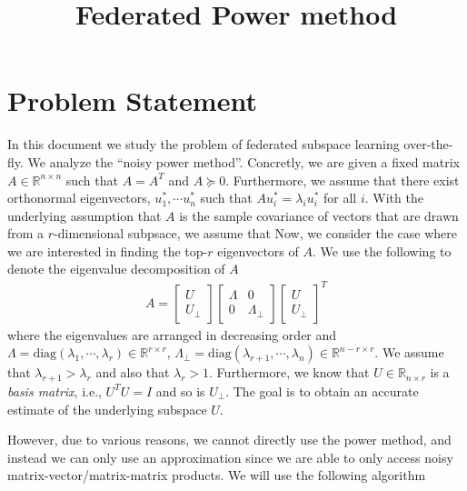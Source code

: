 \documentclass[10pt]{article}
\title{\textbf{Federated Power method}}
\author{}
\date{}
\newcommand{\R}{\mathbb{R}}
\begin{document}
\maketitle


\section{Problem Statement}
In this document we study the problem of federated subspace learning over-the-fly. We analyze the ``noisy power method''. Concretly, we are given a fixed matrix $A \in \R^{n \times n}$ such that $A = A^T$ and $A \succeq 0$. Furthermore, we assume that there exist orthonormal eigenvectors, $u_1^*, \cdots u_n^*$ such that $A u_i^* = \lambda_i u_i^*$ for all $i$. With the underlying assumption that $A$ is the sample covariance of vectors that are drawn from a $r$-dimensional subpsace, we assume that Now, we consider the case where we are interested in finding the top-$r$ eigenvectors of $A$. We use the following to denote the eigenvalue decomposition of $A$ 
\begin{align*}
A = 
\begin{bmatrix}
U \\ U_{\perp}
\end{bmatrix}
\begin{bmatrix}
\Lambda & 0  \\
0 & \Lambda_{\perp}
\end{bmatrix}
\begin{bmatrix}
U \\ U_{\perp}
\end{bmatrix}^T
\end{align*}
where the eigenvalues are arranged in decreasing order and $\Lambda = \mathrm{diag}(\lambda_1, \cdots, \lambda_r) \in \R^{r \times r}$, $\Lambda_{\perp} = \mathrm{diag}(\lambda_{r+1}, \cdots, \lambda_n) \in \R^{n-r \times r}$. We assume that $\lambda_{r+1} > \lambda_r$ and also that $\lambda_r > 1$. Furthermore, we know that $U \in \R_{n \times r}$ is a {\em basis matrix}, i.e., $U^T U = I$ and so is $U_\perp$. The goal is to obtain an accurate estimate of the underlying subspace $U$. 


%
However, due to various reasons, we cannot directly use the power method, and instead we can only use an approximation since we are able to only access noisy matrix-vector/matrix-matrix  products. We will use the following algorithm
\end{document}
